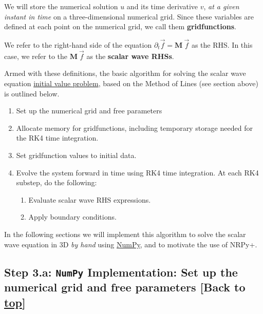 \documentclass[landscape,letterpaper,10pt,english]{article}
\providecommand{\tightlist}{%
      \setlength{\itemsep}{0pt}\setlength{\parskip}{0pt}}
\begin{document}
\[\label{basicalg}\]

We will store the numerical solution \(u\) and its time derivative
\(v\), \emph{at a given instant in time} on a three-dimensional
numerical grid. Since these variables are defined at each point on the
numerical grid, we call them \textbf{gridfunctions}.

We refer to the right-hand side of the equation
\(\partial_t \vec{f} = \mathbf{M}\ \vec{f}\) as the RHS. In this case,
we refer to the \(\mathbf{M}\ \vec{f}\) as the \textbf{scalar wave
RHSs}.

Armed with these definitions, the basic algorithm for solving the scalar
wave equation
\href{https://en.wikipedia.org/wiki/Initial_value_problem}{initial value
problem}, based on the Method of Lines (see section above) is outlined
below.

\begin{enumerate}
\def\labelenumi{\arabic{enumi}.}
\tightlist
\item
  Set up the numerical grid and free parameters
\item
  Allocate memory for gridfunctions, including temporary storage needed
  for the RK4 time integration.
\item
  Set gridfunction values to initial data.
\item
  Evolve the system forward in time using RK4 time integration. At each
  RK4 substep, do the following:

  \begin{enumerate}
  \def\labelenumii{\arabic{enumii}.}
  \tightlist
  \item
    Evaluate scalar wave RHS expressions.
  \item
    Apply boundary conditions.
  \end{enumerate}
\end{enumerate}

In the following sections we will implement this algorithm to solve the
scalar wave equation in 3D \emph{by hand} using
\href{https://numpy.org/}{NumPy}, and to motivate the use of NRPy+.

    \hypertarget{step-3.a-numpy-implementation-set-up-the-numerical-grid-and-free-parameters-back-to-top}{%
\subsection{\texorpdfstring{Step 3.a: \texttt{NumPy} Implementation: Set
up the numerical grid and free parameters {[}Back to
\hyperref[toc]{top}{]}}{Step 3.a: NumPy Implementation: Set up the numerical grid and free parameters {[}Back to {]}}}\label{step-3.a-numpy-implementation-set-up-the-numerical-grid-and-free-parameters-back-to-top}}
\end{document}
